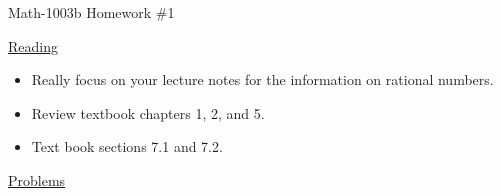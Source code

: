 \documentclass[letterpaper,12pt,fleqn]{article}
\begin{document}
\begin{center}
\Large Math-1003b Homework \#1
\end{center}

\vspace{0.5in}

\underline{Reading}

\bigskip

\begin{itemize}
\item Really focus on your lecture notes for the information on rational
  numbers.
\item Review textbook chapters 1, 2, and 5.
\item Text book sections 7.1 and 7.2.
\end{itemize}

\bigskip

\underline{Problems}

\bigskip
\end{document}
